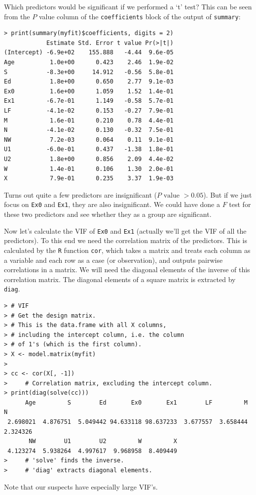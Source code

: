 \documentclass[12pt]{article}
\begin{document}
Which predictors would be significant
if we performed a `t' test?
This can be seen from the $P$ value column of the
\verb+coefficients+ block of the output of \verb+summary+:
\begin{verbatim}
> print(summary(myfit)$coefficients, digits = 2)
            Estimate Std. Error t value Pr(>|t|)
(Intercept) -6.9e+02    155.888   -4.44  9.6e-05
Age          1.0e+00      0.423    2.46  1.9e-02
S           -8.3e+00     14.912   -0.56  5.8e-01
Ed           1.8e+00      0.650    2.77  9.1e-03
Ex0          1.6e+00      1.059    1.52  1.4e-01
Ex1         -6.7e-01      1.149   -0.58  5.7e-01
LF          -4.1e-02      0.153   -0.27  7.9e-01
M            1.6e-01      0.210    0.78  4.4e-01
N           -4.1e-02      0.130   -0.32  7.5e-01
NW           7.2e-03      0.064    0.11  9.1e-01
U1          -6.0e-01      0.437   -1.38  1.8e-01
U2           1.8e+00      0.856    2.09  4.4e-02
W            1.4e-01      0.106    1.30  2.0e-01
X            7.9e-01      0.235    3.37  1.9e-03
\end{verbatim}
Turns out quite a few predictors are insignificant
($P \text{ value } > 0.05$).
But if we just focus on \verb+Ex0+ and \verb+Ex1+,
they are also insignificant.
We could have done a $F$ test for these two predictors
and see whether they as a group are significant.

Now let's calculate the VIF of \verb+Ex0+ and \verb+Ex1+
(actually we'll get the VIF of all the predictors).
To this end we need the correlation matrix of the predictors.
This is calculated by the \texttt{R} function
\verb+cor+, which takes a matrix and treats each column as a variable
and each row as a case (or observation), and outputs pairwise
correlations in a matrix.
We will need the diagonal elements of the inverse of this correlation
matrix. The diagonal elements of a square matrix is extracted by
\verb+diag+.

\begin{verbatim}
> # VIF
> # Get the design matrix.
> # This is the data.frame with all X columns,
> # including the intercept column, i.e. the column
> # of 1's (which is the first column).
> X <- model.matrix(myfit)
> 
> cc <- cor(X[, -1])
>     # Correlation matrix, excluding the intercept column.
> print(diag(solve(cc)))
      Age         S        Ed       Ex0       Ex1        LF         M         N 
 2.698021  4.876751  5.049442 94.633118 98.637233  3.677557  3.658444  2.324326 
       NW        U1        U2         W         X 
 4.123274  5.938264  4.997617  9.968958  8.409449 
>     # 'solve' finds the inverse.
>     # 'diag' extracts diagonal elements.
\end{verbatim}

Note that our suspects have especially large VIF's.
\end{document}
